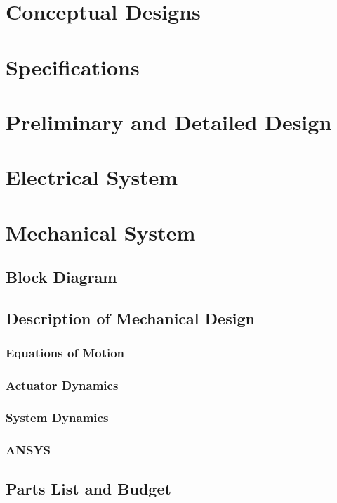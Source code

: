 

\normalem


\section{Conceptual Designs}


\newpage
\section{Specifications}

\newpage
\section{Preliminary and Detailed Design}
\section*{Electrical System}

\section*{Mechanical System}
\subsection*{Block Diagram}

\subsection*{Description of Mechanical Design}

\subsubsection*{Equations of Motion}

\subsubsection*{Actuator Dynamics}

\subsubsection*{System Dynamics}

\newpage
\subsubsection*{ANSYS}

\newpage
\subsection*{Parts List and Budget}

% 
